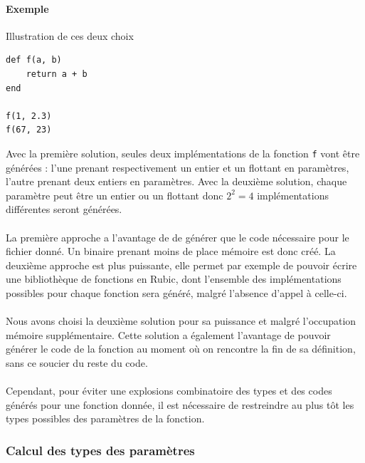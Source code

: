 \documentclass[12pt]{article}
\begin{document}
\paragraph{Exemple} Illustration de ces deux choix
\begin{verbatim}
def f(a, b)
    return a + b
end 

f(1, 2.3)
f(67, 23)
\end{verbatim}

Avec la première solution, seules deux implémentations de la fonction \verb!f! vont être générées : l'une prenant respectivement un entier et un flottant en paramètres, l'autre prenant deux entiers en paramètres.
Avec la deuxième solution, chaque paramètre peut être un entier ou un flottant donc $2^{2} = 4$ implémentations différentes seront générées.

\paragraph{}La première approche a l'avantage de de générer que le code nécessaire pour le fichier donné. Un binaire prenant moins de place mémoire est donc créé.
La deuxième approche est plus puissante, elle permet par exemple de pouvoir écrire une bibliothèque de fonctions en Rubic, dont l'ensemble des implémentations possibles pour chaque fonction sera généré, malgré l'absence d'appel à celle-ci.

\paragraph{}Nous avons choisi la deuxième solution pour sa puissance et malgré l'occupation mémoire supplémentaire. Cette solution a également l'avantage de pouvoir générer le code de la fonction au moment où on rencontre la fin de sa définition, sans ce soucier du reste du code.

\paragraph{}Cependant, pour éviter une explosions combinatoire des types et des codes générés pour une fonction donnée, il est nécessaire de restreindre au plus tôt les types possibles des paramètres de la fonction.

\subsubsection{Calcul des types des paramètres}
\end{document}
